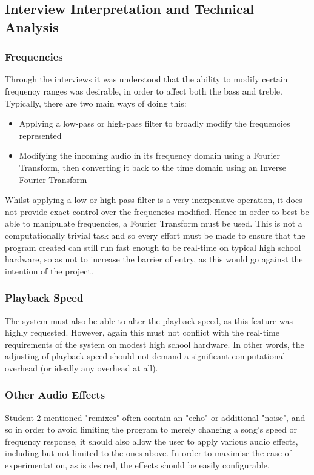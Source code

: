 \documentclass{article}
\begin{document}
	\subsection{Interview Interpretation and Technical Analysis}
	\subsubsection{Frequencies}
	Through the interviews it was understood that the ability to modify certain frequency ranges was desirable, in order to affect both the bass and treble. Typically, there are two main ways of doing this:
	\begin{itemize}
		\item Applying a low-pass or high-pass filter to broadly modify the frequencies represented
		\item Modifying the incoming audio in its frequency domain using a Fourier Transform, then converting it back to the time domain using an Inverse Fourier Transform
	\end{itemize}
	Whilst applying a low or high pass filter is a very inexpensive operation, it does not provide exact control over the frequencies modified. Hence in order to best be able to manipulate frequencies, a Fourier Transform must be used.  This is not a computationally trivial task and so every effort must be made to ensure that the program created can still run fast enough to be real-time on typical high school hardware, so as not to increase the barrier of entry, as this would go against the intention of the project.
	
	\subsubsection{Playback Speed}
	The system must also be able to alter the playback speed, as this feature was highly requested. However, again this must not conflict with the real-time requirements of the system on modest high school hardware. In other words, the adjusting of playback speed should not demand a significant computational overhead (or ideally any overhead at all).
	
	\subsubsection{Other Audio Effects}
	Student 2 mentioned "remixes" often contain an "echo" or additional "noise", and so in order to avoid limiting the program to merely changing a song's speed or frequency response, it should also allow the user to apply various audio effects, including but not limited to the ones above. In order to maximise the ease of experimentation, as is desired, the effects should be easily configurable.
		
\end{document}
